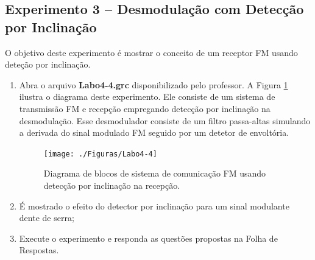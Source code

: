 \documentclass[12pt,addpoints]{exam}
\begin{document}
%
\newpage
\subsection{Experimento 3 -- Desmodulação com Detecção por Inclinação}

O objetivo deste experimento é mostrar o conceito de um receptor FM usando deteção por inclinação.

\begin{enumerate}
    \item  Abra o arquivo \textbf{Labo4-4.grc} disponibilizado pelo professor. A Figura \ref{fig:GRC_4-4} ilustra o diagrama deste experimento. Ele consiste de um sistema de transmissão FM e recepção empregando detecção por inclinação na desmodulação. Esse desmodulador consiste de um filtro passa-altas simulando a derivada do sinal modulado FM seguido por um detetor de envoltória.
    \begin{figure}[htb]
        \centering
        \texttt{[image: ./Figuras/Labo4-4]}
        \caption{Diagrama de blocos de sistema de comunicação FM usando detecção por inclinação na recepção.} 
        \label{fig:GRC_4-4}
    \end{figure}
  \item É mostrado o efeito do detector por inclinação para um sinal modulante dente de serra;
  \item Execute o experimento e responda as questões propostas na Folha de Respostas.
\end{enumerate}
\end{document}
